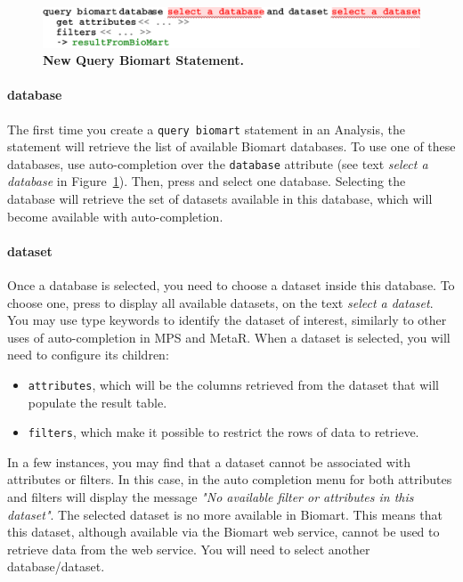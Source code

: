  \begin{figure}[h!tbp]
  \centering
  \includegraphics[width=\figWidthWide]{figures/NewBiomart.pdf}
\caption[New Query Biomart Statement.]{\textbf{New Query Biomart Statement.}}
\label{fig:NewBiomart}
\end{figure}


\paragraph{database}

The first time you create a \texttt{query biomart} statement in an Analysis, the statement will retrieve the list of available Biomart databases. To use one of these databases, use auto-completion over the \texttt{database} attribute (see  text \textit{select a database} in Figure~\ref{fig:NewBiomart}). Then, press \keys{\ctrl+\space} and select one database. Selecting the database will retrieve the set of datasets available in this database, which will become available with auto-completion.


 \paragraph{dataset} 
Once a database is selected, you need to choose a dataset inside this database. To choose one, press \keys{\ctrl+\space} to display all available datasets, on the text \textit{select a dataset}. You may use type keywords to identify the dataset of interest, similarly to other uses of auto-completion in MPS and MetaR. When a dataset is selected, you will need to configure its children:
\begin{itemize}

\item \texttt{attributes}, which will be the columns retrieved from the dataset that will populate the result table.
\item \texttt{filters}, which make it possible  to restrict the rows of data to retrieve.
\end{itemize}

\begin{remark}
In a few instances, you may find that a dataset cannot be associated with attributes or filters. In this case, in the auto completion menu for both attributes and filters will display the message \textit{"No available filter or attributes in this dataset"}. The selected dataset is no more available in Biomart. This means that this dataset, although available via the Biomart web service, cannot be used to retrieve data from the web service. You will need to select another database/dataset. 
\end{remark}

